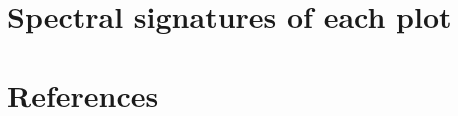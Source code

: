 \documentclass[review]{elsarticle}
\begin{document}
\section{Spectral signatures of each plot}


\pagebreak


\section*{References}


\end{document}
